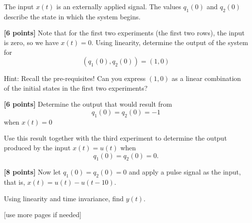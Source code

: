 \documentclass{ee102_pset}
\begin{document}
The input $x(t)$ is an externally applied signal. The values
$q_1(0)$ and $q_2(0)$ describe the state in which the system begins.

\problempart \textbf{[6 points]} Note that for the first two experiments (the first two rows), the input is zero, so we have $x(t)=0$.
Using linearity, determine the output of the system for 
\[
(q_1(0),q_2(0))=(1,0)
\] 

Hint: Recall the pre-requisites! Can you express $(1,0)$ as a linear combination of the initial states in the first two experiments? 

\problempart \textbf{[6 points]} Determine the output that would result from
\[
q_1(0)=q_2(0)=-1
\]
when $x(t)=0$ 

Use this result together with the third experiment to determine the
output produced by the input $x(t)=u(t)$ when
\[
q_1(0)=q_2(0)=0.
\]


\problempart \textbf{[8 points]} Now let
\(
q_1(0)=q_2(0)=0
\)
and apply a pulse signal as the input, that is, 
\(
x(t)=u(t)-u(t-10).
\)

Using linearity and time invariance, find $y(t)$.




\vspace*{\fill}
\begin{center}
[use more pages if needed]
\end{center}
\end{document}
